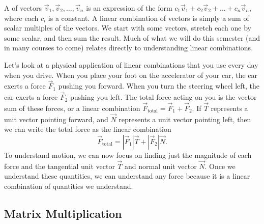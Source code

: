 A  of vectors $\vec v_{1}, \vec v_{2}, \ldots, \vec v_{n}$ is an expression of the form {$c_1\vec v_{1}+c_2\vec v_{2}+\ldots+c_n\vec v_{n}$}, where each {$c_i$} is a constant. 
A linear combination of vectors is simply a sum of scalar multiples of the vectors. 
We start with some vectors, stretch each one by some scalar, and then sum the result. 
Much of what we will do this semester (and in many courses to come) relates directly to understanding linear combinations.  

\begin{example}
Let's look at a physical application of linear combinations that you use every day when you drive.
When you place your foot on the accelerator of your car, the car exerts a force $\vec F_{1}$ pushing you forward. When you turn the steering wheel left, the car exerts a force $\vec F_{2}$ pushing you left. The total force acting on you is the vector sum of these forces, or a linear combination $\vec F_{\text{total}} = \vec F_1 +\vec F_2$. If $\vec T$ represents a unit vector pointing forward, and $\vec N$ represents a unit vector pointing left, then we can write the total force as the linear combination
$$\vec F_{\text{total}} = |\vec F_1|\vec T +|\vec F_2|\vec N.$$
To understand motion, we can now focus on finding just the magnitude of each force and the tangential unit vector $\vec T$ and normal unit vector $\vec N$.  Once we understand these quantities, we can understand any force because it is a linear combination of quantities we understand.
\end{example}

\subsection{Matrix Multiplication}

